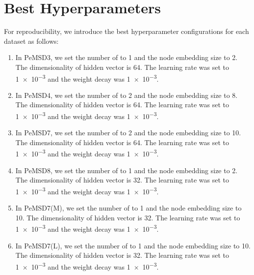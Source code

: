 \documentclass[letterpaper]{article} \usepackage{aaai22}  \usepackage{times}  \usepackage{helvet}  \usepackage{courier}  \usepackage[hyphens]{url}  \usepackage{graphicx} \urlstyle{rm} \def\UrlFont{\rm}  \usepackage{natbib}  \usepackage{caption} \DeclareCaptionStyle{ruled}{labelfont=normalfont,labelsep=colon,strut=off} \frenchspacing  \setlength{\pdfpagewidth}{8.5in}  \setlength{\pdfpageheight}{11in}  \usepackage{stfloats}
\begin{document}
\section{Best Hyperparameters}
For reproducibility, we introduce the best hyperparameter configurations for each dataset as follows:
\begin{enumerate}
    \item In PeMSD3, we set the number of  to 1 and the node embedding size  to 2. The dimensionality of hidden vector is 64. The learning rate was set to \num{1e-3} and the weight decay was \num{1e-3}.
    \item In PeMSD4, we set the number of  to 2 and the node embedding size  to 8. The dimensionality of hidden vector is 64. The learning rate was set to \num{1e-3} and the weight decay was \num{1e-3}.
    \item In PeMSD7, we set the number of  to 2 and the node embedding size  to 10. The dimensionality of hidden vector is 64. The learning rate was set to \num{1e-3} and the weight decay was \num{1e-3}.
    \item In PeMSD8, we set the number of  to 1 and the node embedding size  to 2. The dimensionality of hidden vector is 32. The learning rate was set to \num{1e-3} and the weight decay was \num{1e-3}.
    \item In PeMSD7(M), we set the number of  to 1 and the node embedding size  to 10. The dimensionality of hidden vector is 32. The learning rate was set to \num{1e-3} and the weight decay was \num{1e-3}.
    \item In PeMSD7(L), we set the number of  to 1 and the node embedding size  to 10. The dimensionality of hidden vector is 32. The learning rate was set to \num{1e-3} and the weight decay was \num{1e-3}.
\end{enumerate}
\end{document}
